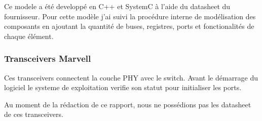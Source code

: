 Ce modele a \'et\'e developp\'e en C++ et SystemC \`a l'aide du datasheet du fournisseur. Pour cette modèle j'ai suivi la procédure interne de modélisation des composants en ajoutant la quantit\'e  de buses, registres, ports et fonctionalit\'es de chaque élément. 

\subsubsection{Transceivers Marvell}

Ces transceivers connectent la couche PHY avec le switch. Avant le démarrage du logiciel le systeme de exploitation verifie son statut pour initialiser les ports.

Au moment de la rédaction de ce rapport, nous ne possédions pas les datasheet de ces transceivers.